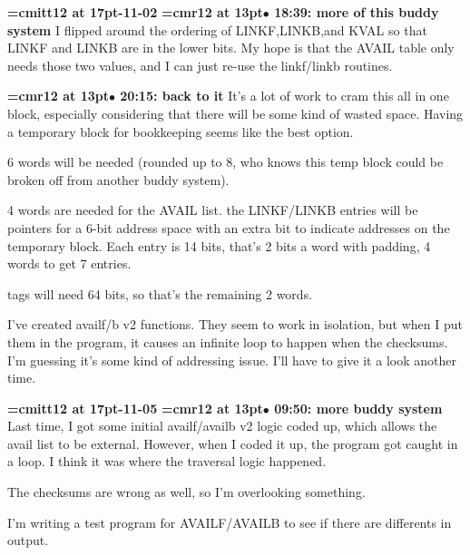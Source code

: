 {\medskip\noindent\bf\font\titlefont=cmitt12 at 17pt-11-02}\medskip
{\smallskip\noindent\bf\font\titlefont=cmr12 at 13pt\titlefont $\bullet$ 18:39: more of this buddy system}\smallskip
I flipped around the ordering of LINKF,LINKB,and KVAL so that LINKF and LINKB are in the lower bits. My hope is that the AVAIL table only needs those two values, and I can just re-use the linkf/linkb routines.
\par

{\smallskip\noindent\bf\font\titlefont=cmr12 at 13pt\titlefont $\bullet$ 20:15: back to it}\smallskip
It's a lot of work to cram this all in one block, especially considering that there will be some kind of wasted space. Having a temporary block for bookkeeping seems like the best option.
\par

6 words will be needed (rounded up to 8, who knows this temp block could be broken off from another buddy system).
\par

4 words are needed for the AVAIL list. the LINKF/LINKB entries will be pointers for a 6-bit address space with an extra bit to indicate addresses on the temporary block. Each entry is 14 bits, that's 2 bits a word with padding, 4 words to get 7 entries.
\par

tags will need 64 bits, so that's the remaining 2 words.
\par

I've created availf/b v2 functions. They seem to work in isolation, but when I put them in the program, it causes an infinite loop to happen when the checksums. I'm guessing it's some kind of addressing issue. I'll have to give it a look another time.
\par

{\medskip\noindent\bf\font\titlefont=cmitt12 at 17pt-11-05}\medskip
{\smallskip\noindent\bf\font\titlefont=cmr12 at 13pt\titlefont $\bullet$ 09:50: more buddy system}\smallskip
Last time, I got some initial availf/availb v2 logic coded up, which allows the avail list to be external. However, when I coded it up, the program got caught in a loop. I think it was where the traversal logic happened.
\par

The checksums are wrong as well, so I'm overlooking something.
\par

I'm writing a test program for AVAILF/AVAILB to see if there are differents in output.
\par


